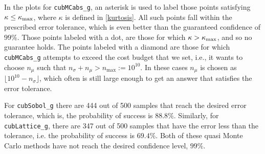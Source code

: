 \documentclass{iitthesis}
\theoremstyle{definition}
\begin{document}
In the plots for {\tt cubMCabs\_g}, an asterisk is used to label those points satisfying $\kappa \le \kappa_{\max}$, where $\kappa$ is defined in \eqref{kurtosis}. All such points fall within the prescribed error tolerance,
which is even better than the guaranteed confidence of $99\%$.  Those points labeled with a dot, are those for which $\kappa > \kappa_{\max}$, and so no guarantee holds. The points labeled with a diamond are those for which  {\tt cubMCabs\_g}  attempts to exceed the cost budget that we set, i.e., it wants to choose $n_\mu$ such that $n_{\sigma}+n_\mu > n_{\max}:=10^{10}$. In these cases $n_\mu$ is chosen as $\lfloor 10^{10} - n_\sigma \rfloor$, which often is still large enough to get an answer that satisfies the error tolerance. 
 
For {\tt cubSobol\_g} there are 444 out of 500 samples that reach the desired error tolerance, which is, the probability of success is $88.8\%$. Similarly, for {\tt cubLattice\_g}, there are 347 out of 500 samples that have the error less than the tolerance, i.e. the probability of success is $69.4\%$. Both of these quasi Monte Carlo methods have not reach the desired confidence level, $99\%$.

\label{subsec:meanmcabssinglehump}
\end{document}
